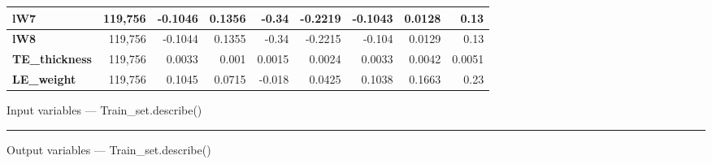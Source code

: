 \documentclass[9pt,a4paper]{article}
\newcommand{\exhead}[1]{%
  \medskip\noindent{\small\bfseries\color{primary}#1}%
  \par\vspace{-5pt}\noindent\textcolor{primary}{\rule{\linewidth}{0.4pt}}\vspace{2pt}}
\begin{document}
\begin{minipage}{\linewidth}
\begin{center}
{\begin{tabular}{|l|r|r|r|r|r|r|r|r|}
\textbf{lW7} & 119,756 & -0.1046 & 0.1356 & -0.34 & -0.2219 & -0.1043 & 0.0128 & 0.13 \\ \hline
\textbf{lW8} & 119,756 & -0.1044 & 0.1355 & -0.34 & -0.2215 & -0.104 & 0.0129 & 0.13 \\ \hline
\textbf{TE\_thickness} & 119,756 & 0.0033 & 0.001 & 0.0015 & 0.0024 & 0.0033 & 0.0042 & 0.0051 \\ \hline
\textbf{LE\_weight} & 119,756 & 0.1045 & 0.0715 & -0.018 & 0.0425 & 0.1038 & 0.1663 & 0.23 \\ \hline
\end{tabular}
}
\par\vspace{2pt}
{\scriptsize Input variables — Train\_set.describe()}
\end{center}
\end{minipage}\par\medskip
\par\begin{minipage}{\linewidth}
\exhead{Outputs}
\begin{center}
\footnotesize
\renewcommand{\arraystretch}{1.15}
\par\vspace{2pt}
{\scriptsize Output variables — Train\_set.describe()}
\end{center}
\end{minipage}\par\medskip
\end{document}
